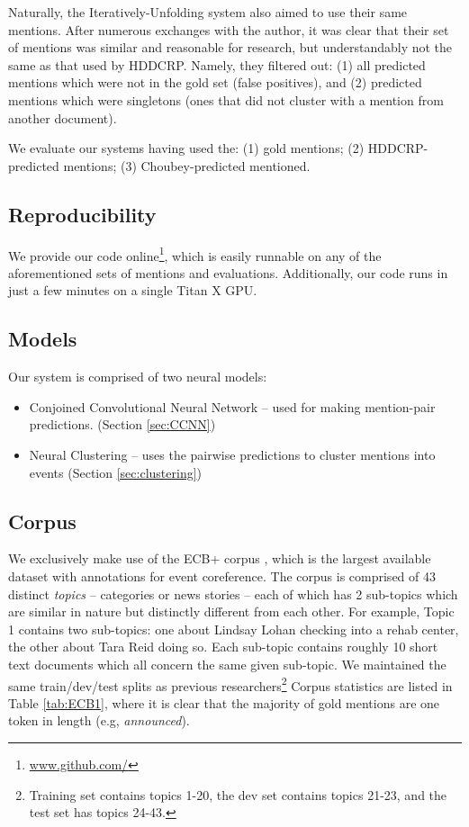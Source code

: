 \documentclass[11pt,a4paper]{article}
\begin{document}
Naturally, the Iteratively-Unfolding system also aimed to use their same mentions.  After numerous exchanges with the author, it was clear that their set of mentions was similar and reasonable for research, but understandably not the same as that used by HDDCRP.  Namely, they filtered out: (1) all predicted mentions which were not in the gold set (false positives), and (2) predicted mentions which were singletons (ones that did not cluster with a mention from another document).

We evaluate our systems having used the: (1) gold mentions; (2) HDDCRP-predicted mentions; (3) Choubey-predicted mentioned.

\subsection{Reproducibility}
We provide our code online\footnote{\url{www.github.com/}}, which is easily runnable on any of the aforementioned sets of mentions and evaluations.  Additionally, our code runs in just a few minutes on a single Titan X GPU.
\subsection{Models}
Our system is comprised of two neural models:
\begin{itemize}
  \item Conjoined Convolutional Neural Network -- used for making mention-pair predictions.  (Section \ref{sec:CCNN})
  \item Neural Clustering -- uses the pairwise predictions to cluster mentions into events (Section \ref{sec:clustering})
\end{itemize}
\subsection{Corpus}
\label{sec:corpus}
We exclusively make use of the ECB+ corpus \cite{ECB+}, which is the largest available dataset with annotations for event coreference.  The corpus is comprised of 43 distinct \textit{topics} -- categories or news stories -- each of which has 2 sub-topics which are similar in nature but distinctly different from each other.  For example, Topic 1 contains two sub-topics: one about Lindsay Lohan checking into a rehab center, the other about Tara Reid doing so.  Each sub-topic contains roughly 10 short text documents which all concern the same given sub-topic.  We maintained the same train/dev/test splits as previous researchers\footnote{Training set contains topics 1-20, the dev set contains topics 21-23, and the test set has topics 24-43.}  Corpus statistics are listed in Table \ref{tab:ECB1}, where it is clear that the majority of gold mentions are one token in length (e.g, \textit{announced}).
\end{document}
